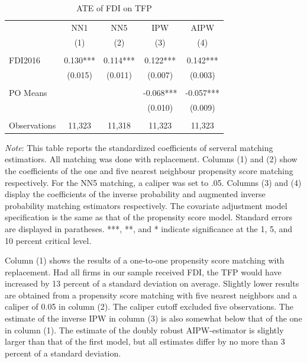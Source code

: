 \documentclass[a4paper,11pt]{scrartcl}
\begin{document}
\begin{table}[h!]
 	\centering
   	\caption{ATE of FDI on TFP}
   	\label{tab:mainresults}
\begin{threeparttable}
	
 \begin{tabular}{l*{4}{c}}
	\hline
	\hline
 			& NN1 & NN5 & IPW & AIPW \\
 			& (1) & (2) & (3)  & (4) \\ \hline
 			&  &  &  &    \\
FDI2016 	& 0.130*** & 0.114*** & 0.122***  & 0.142***   \\
 			& (0.015) & (0.011) & (0.007) &   (0.003)  \\
 	&  &  &  &    \\
PO Means 	& & & -0.068*** &  -0.057*** \\
			&  &  & (0.010)  &  (0.009) \\
			&  &  &  &    \\
 Observations & 11,323 & 11,318 & 11,323 & 11,323 \\ 
 	\hline
 	\hline 
\end{tabular}

\begin{tablenotes}[flushleft]
      \footnotesize
\item \textit{Note}: This table reports the standardized coefficients of serveral matching estimatiors. All matching was done with replacement. Columns (1) and (2) show the coefficients of the one and five nearest neighbour propensity score matching respectively. For the NN5 matching, a caliper was set to .05. Columns (3) and (4) display the coefficients of the inverse probability and augmented inverse probability matching estimators respectively. The covariate adjustment model specification is the same as that of the propensity score model. Standard errors are displayed in paratheses. ***, **, and * indicate significance at the 1, 5, and 10 percent critical level.

\end{tablenotes}

\end{threeparttable}
\end{table}

Column (1) shows the results of a one-to-one propensity score matching with replacement. Had all firms in our sample received FDI, the TFP would have increased by 13 percent of a standard deviation on average. Slightly lower results are obtained from a propensity score matching with five nearest neighbors and a caliper of 0.05 in column (2). The caliper cutoff excluded five observations. The estimate of the inverse IPW in column (3) is also somewhat below that of the one in column (1). The estimate of the doubly robust AIPW-estimator is slightly larger than that of the first model, but all estimates differ by no more than 3 percent of a standard deviation.
\end{document}
